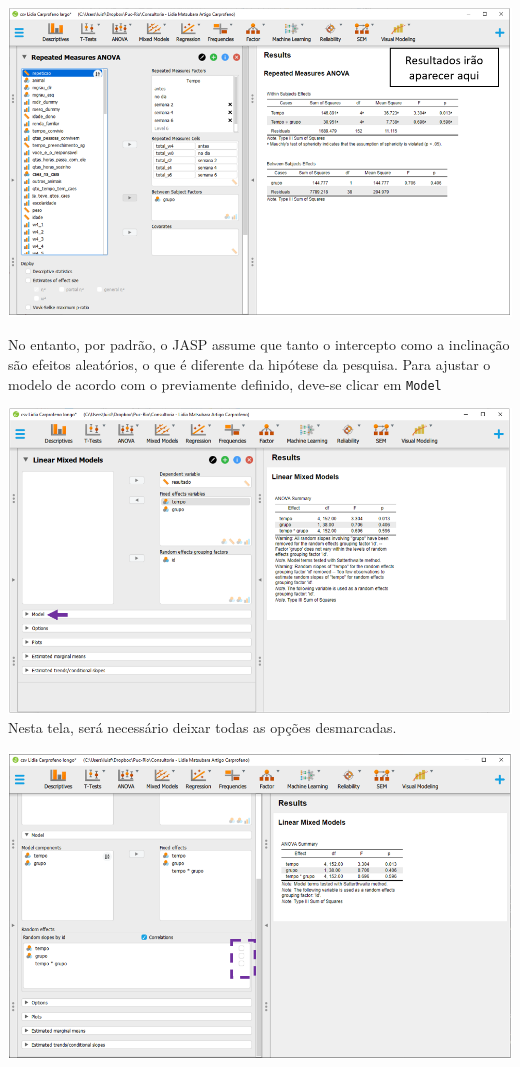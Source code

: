 \documentclass[
]{book}
\begin{document}
\includegraphics{./img/cap_anovarm_resultados2.png}

No entanto, por padrão, o JASP assume que tanto o intercepto como a inclinação são efeitos aleatórios, o que é diferente da hipótese da pesquisa. Para ajustar o modelo de acordo com o previamente definido, deve-se clicar em \texttt{Model}

\includegraphics{./img/cap_lmm_model.png}
Nesta tela, será necessário deixar todas as opções desmarcadas.

\includegraphics{./img/cap_lmm_model2.png}
\end{document}
